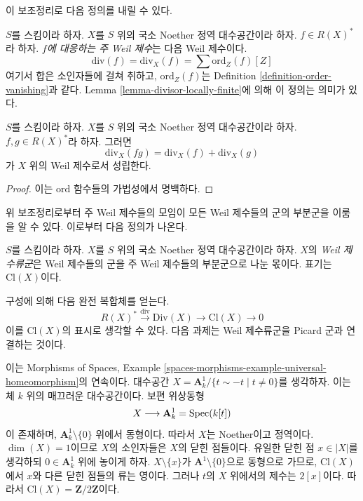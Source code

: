 \noindent
이 보조정리로 다음 정의를 내릴 수 있다.

\begin{definition}
\label{definition-principal-divisor}
$S$를 스킴이라 하자. $X$를 $S$ 위의 국소 Noether 정역 대수공간이라
하자. $f \in R(X)^*$라 하자. {\it $f$에 대응하는 주 Weil 제수}는
다음 Weil 제수이다.
$$
\text{div}(f) = \text{div}_X(f) = \sum \text{ord}_Z(f) [Z]
$$
여기서 합은 소인자들에 걸쳐 취하고, $\text{ord}_Z(f)$는 Definition
\ref{definition-order-vanishing}과 같다. Lemma
\ref{lemma-divisor-locally-finite}에 의해 이 정의는 의미가 있다.
\end{definition}

\begin{lemma}
\label{lemma-div-additive}
$S$를 스킴이라 하자. $X$를 $S$ 위의 국소 Noether 정역 대수공간이라
하자. $f, g \in R(X)^*$라 하자. 그러면
$$
\text{div}_X(fg) = \text{div}_X(f) + \text{div}_X(g)
$$
가 $X$ 위의 Weil 제수로서 성립한다.
\end{lemma}

\begin{proof}
이는 $\text{ord}$ 함수들의 가법성에서 명백하다.
\end{proof}

\noindent
위 보조정리로부터 주 Weil 제수들의 모임이 모든 Weil 제수들의 군의
부분군을 이룸을 알 수 있다. 이로부터 다음 정의가 나온다.

\begin{definition}
\label{definition-class-group}
$S$를 스킴이라 하자. $X$를 $S$ 위의 국소 Noether 정역 대수공간이라
하자. $X$의 {\it Weil 제수류군}은 Weil 제수들의 군을 주 Weil
제수들의 부분군으로 나눈 몫이다. 표기는 $\text{Cl}(X)$이다.
\end{definition}

\noindent
구성에 의해 다음 완전 복합체를 얻는다.
\begin{equation}
\label{equation-Weil-divisor-class}
R(X)^* \xrightarrow{\text{div}} \text{Div}(X) \to \text{Cl}(X) \to 0
\end{equation}
이를 $\text{Cl}(X)$의 표시로 생각할 수 있다. 다음 과제는 Weil
제수류군을 Picard 군과 연결하는 것이다.

\begin{example}
\label{example-Z-mod-2}
이는 Morphisms of Spaces, Example
\ref{spaces-morphisms-example-universal-homeomorphism}의 연속이다. 대수공간
$X = \mathbf{A}^1_k/\{t \sim -t \mid t \not = 0\}$를 생각하자. 이는 체
$k$ 위의 매끄러운 대수공간이다. 보편 위상동형
$$
X \longrightarrow \mathbf{A}^1_k = \mathop{\mathrm{Spec}}(k[t])
$$
이 존재하며, $\mathbf{A}^1_k \setminus \{0\}$ 위에서 동형이다. 따라서
$X$는 Noether이고 정역이다. $\dim(X) = 1$이므로 $X$의 소인자들은
$X$의 닫힌 점들이다. 유일한 닫힌 점 $x \in |X|$를 생각하되
$0 \in \mathbf{A}^1_k$ 위에 놓이게 하자.
$X \setminus \{x\}$가 $\mathbf{A}^1 \setminus \{0\}$으로 동형으로
가므로, $\text{Cl}(X)$에서 $x$와 다른 닫힌 점들의 류는 영이다. 그러나
$t$의 $X$ 위에서의 제수는 $2[x]$이다. 따라서
$\text{Cl}(X) = \mathbf{Z}/2\mathbf{Z}$이다.
\end{example}

